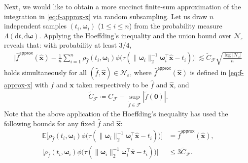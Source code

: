 \documentclass[english]{article}
\begin{document}
Next, we would like to obtain a more succinct finite-sum approximation of the integration in \eqref{eq:f-approx-x} via random subsampling. 
Let us draw $n$ independent samples $(t_i, \bm{\omega}_i)$ ($1\leq i\leq n$) from the probability measure  $\Lambda(\mathrm{d}t, \mathrm{d}\bm{\omega})$.  
Applying the Hoeffding's inequality and the union bound over $\mathcal{N}_{\varepsilon}$ reveals that: with probability at least $3/4$, 
%
\begin{align*}
\bigg| \widehat{f}^{\mathsf{approx}}(\widehat{\bm x}) - \frac{1}{n}\sum_{i = 1}^n\rho_{\widehat{f}}(t_i, \bm{\omega}_i)\phi\big(\tau(\|\bm{\omega}_i\|_2^{-1}\bm{\omega}_i^{\top}\widehat{\bm x} - t_i)\big)\bigg|
\lesssim \widetilde{C}_{\mathcal{F}}\sqrt{\frac{\log|\mathcal{N}_{\varepsilon}|}{n}}
\end{align*}
holds simultaneously for all $(\widehat{f}, \widehat{\bm x}) \in \mathcal{N}_{\varepsilon}$, where $\widehat{f}^{\mathsf{approx}}(\widehat{\bm x})$ is defined in \eqref{eq:f-approx-x} with $f$ and $\bm{x}$ taken respectively to be $\widehat{f}$ and $\widehat{\bm{x}}$, and 
%
\begin{align}
\widetilde{C}_\mathcal{F} \coloneqq C_\mathcal{F} - \sup_{\tilde{f}\in\mathcal{F}}|\tilde{f}({\bm 0})|.
\end{align}
%
%
Note that the above application of the Hoeffding's inequality has used the following bounds for any fixed $\widehat{f}$ and $\widehat{\bm{x}}$:  
%
\begin{align*}
\mathbb{E}\big[\rho_{\widehat{f}}(t_i, \bm{\omega}_i)\phi\big(\tau(\|\bm{\omega}_i\|_2^{-1}\bm{\omega}_i^{\top}\widehat{\bm x} - t_i)\big)\big] &= \widehat{f}^{\mathsf{approx}}(\widehat{\bm x}), \\
\big|\rho_{\widehat{f}}(t_i, \bm{\omega}_i)\phi\big(\tau(\|\bm{\omega}_i\|_2^{-1}\bm{\omega}_i^{\top}\widehat{\bm x} - t_i)\big)\big| &\le 3\widetilde{C}_{\mathcal{F}}. %
\end{align*}
%
\end{document}
